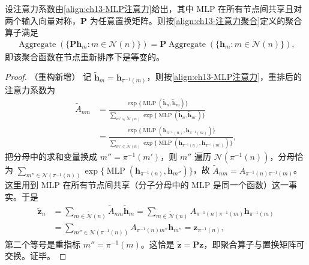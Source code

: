 \documentclass[../../main.tex]{subfiles}
\begin{document}
\begin{proposition}[图注意力聚合的置换等变性]\label{proposition:ch13-图注意力等变性}
设注意力系数由\eqref{align:ch13-MLP注意力}给出，其中 MLP 在所有节点间共享且对两个输入向量对称，$\bm{P}$ 为任意置换矩阵。则按\eqref{align:ch13-注意力聚合}定义的聚合算子满足
\begin{align*}
\operatorname{Aggregate}\left(\{\bm{P}\bm{h}_m:m\in\mathcal{N}(n)\}\right)=\bm{P}\operatorname{Aggregate}\left(\{\bm{h}_m:m\in\mathcal{N}(n)\}\right),
\end{align*}
即该聚合函数在节点重新排序下是等变的。
\end{proposition}

\begin{proof}（重构新增）
记 $\widetilde{\bm{h}}_m=\bm{h}_{\pi^{-1}(m)}$，则按\eqref{align:ch13-MLP注意力}，重排后的注意力系数为
\begin{align*}
\widetilde{A}_{nm}&=\frac{\exp\{\operatorname{MLP}(\widetilde{\bm{h}}_n,\widetilde{\bm{h}}_m)\}}{\sum_{m'\in\widetilde{\mathcal{N}}(n)}\exp\{\operatorname{MLP}(\widetilde{\bm{h}}_n,\widetilde{\bm{h}}_{m'})\}}\\
&=\frac{\exp\{\operatorname{MLP}(\bm{h}_{\pi^{-1}(n)},\bm{h}_{\pi^{-1}(m)})\}}{\sum_{m'\in\widetilde{\mathcal{N}}(n)}\exp\{\operatorname{MLP}(\bm{h}_{\pi^{-1}(n)},\bm{h}_{\pi^{-1}(m')})\}},
\end{align*}
把分母中的求和变量换成 $m''=\pi^{-1}(m')$，则 $m''$ 遍历 $\mathcal{N}(\pi^{-1}(n))$，分母恰为 $\sum_{m''\in\mathcal{N}(\pi^{-1}(n))}\exp\{\operatorname{MLP}(\bm{h}_{\pi^{-1}(n)},\bm{h}_{m''})\}$，故 $\widetilde{A}_{nm}=A_{\pi^{-1}(n)\pi^{-1}(m)}$。这里用到 MLP 在所有节点间共享（分子分母中的 MLP 是同一个函数）这一事实。于是
\begin{align*}
\widetilde{\bm{z}}_n&=\sum_{m\in\widetilde{\mathcal{N}}(n)}\widetilde{A}_{nm}\widetilde{\bm{h}}_m=\sum_{m\in\widetilde{\mathcal{N}}(n)}A_{\pi^{-1}(n)\pi^{-1}(m)}\bm{h}_{\pi^{-1}(m)}\\
&=\sum_{m''\in\mathcal{N}(\pi^{-1}(n))}A_{\pi^{-1}(n)m''}\bm{h}_{m''}=\bm{z}_{\pi^{-1}(n)},
\end{align*}
第二个等号是重指标 $m''=\pi^{-1}(m)$。这恰是 $\widetilde{\bm{z}}=\bm{P}\bm{z}$，即聚合算子与置换矩阵可交换。证毕。
\end{proof}
\end{document}

